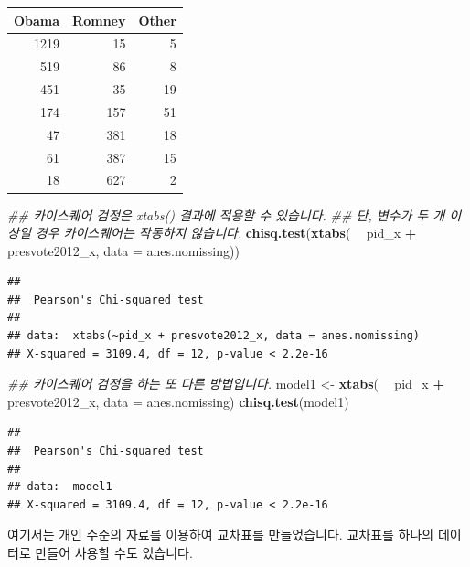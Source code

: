 \documentclass[]{book}
\newenvironment{Shaded}{\begin{snugshade}}{\end{snugshade}}
\newcommand{\CommentTok}[1]{\textcolor[rgb]{0.56,0.35,0.01}{\textit{#1}}}
\newcommand{\DataTypeTok}[1]{\textcolor[rgb]{0.13,0.29,0.53}{#1}}
\newcommand{\KeywordTok}[1]{\textcolor[rgb]{0.13,0.29,0.53}{\textbf{#1}}}
\newcommand{\NormalTok}[1]{#1}
\newcommand{\OperatorTok}[1]{\textcolor[rgb]{0.81,0.36,0.00}{\textbf{#1}}}
\newcommand{\StringTok}[1]{\textcolor[rgb]{0.31,0.60,0.02}{#1}}
\begin{document}
\begin{tabular}{r|r|r}
\hline
Obama & Romney & Other\\
\hline
1219 & 15 & 5\\
\hline
519 & 86 & 8\\
\hline
451 & 35 & 19\\
\hline
174 & 157 & 51\\
\hline
47 & 381 & 18\\
\hline
61 & 387 & 15\\
\hline
18 & 627 & 2\\
\hline
\end{tabular}

\begin{Shaded}
\begin{Highlighting}[]
\CommentTok{## 카이스퀘어 검정은 xtabs() 결과에 적용할 수 있습니다.}
\CommentTok{## 단, 변수가 두 개 이상일 경우 카이스퀘어는 작동하지 않습니다.}
\KeywordTok{chisq.test}\NormalTok{(}\KeywordTok{xtabs}\NormalTok{( }\OperatorTok{~}\StringTok{ }\NormalTok{pid_x }\OperatorTok{+}\StringTok{ }\NormalTok{presvote2012_x, }\DataTypeTok{data =}\NormalTok{ anes.nomissing)) }
\end{Highlighting}
\end{Shaded}

\begin{verbatim}
## 
##  Pearson's Chi-squared test
## 
## data:  xtabs(~pid_x + presvote2012_x, data = anes.nomissing)
## X-squared = 3109.4, df = 12, p-value < 2.2e-16
\end{verbatim}

\begin{Shaded}
\begin{Highlighting}[]
\CommentTok{## 카이스퀘어 검정을 하는 또 다른 방법입니다.}
\NormalTok{model1 <-}\StringTok{ }\KeywordTok{xtabs}\NormalTok{( }\OperatorTok{~}\StringTok{ }\NormalTok{pid_x }\OperatorTok{+}\StringTok{ }\NormalTok{presvote2012_x, }\DataTypeTok{data =}\NormalTok{ anes.nomissing)}
\KeywordTok{chisq.test}\NormalTok{(model1)}
\end{Highlighting}
\end{Shaded}

\begin{verbatim}
## 
##  Pearson's Chi-squared test
## 
## data:  model1
## X-squared = 3109.4, df = 12, p-value < 2.2e-16
\end{verbatim}

여기서는 개인 수준의 자료를 이용하여 교차표를 만들었습니다. 교차표를 하나의 데이터로 만들어 사용할 수도 있습니다.
\end{document}
